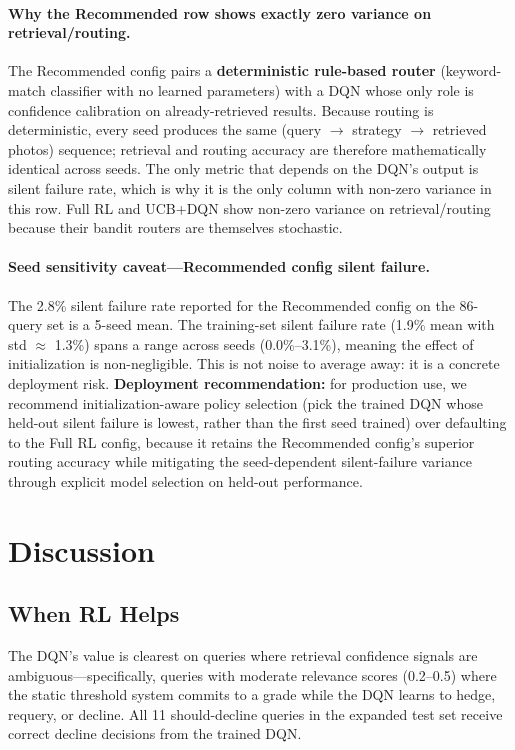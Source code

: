 \documentclass[11pt,letterpaper]{article}
\begin{document}
\paragraph{Why the Recommended row shows exactly zero variance on retrieval/routing.} The Recommended config pairs a \textbf{deterministic rule-based router} (keyword-match classifier with no learned parameters) with a DQN whose only role is confidence calibration on already-retrieved results. Because routing is deterministic, every seed produces the same (query $\to$ strategy $\to$ retrieved photos) sequence; retrieval and routing accuracy are therefore mathematically identical across seeds. The only metric that depends on the DQN's output is silent failure rate, which is why it is the only column with non-zero variance in this row. Full RL and UCB+DQN show non-zero variance on retrieval/routing because their bandit routers are themselves stochastic.

\paragraph{Seed sensitivity caveat---Recommended config silent failure.} The 2.8\% silent failure rate reported for the Recommended config on the 86-query set is a 5-seed mean. The training-set silent failure rate (1.9\% mean with std $\approx$ 1.3\%) spans a range across seeds (0.0\%--3.1\%), meaning the effect of initialization is non-negligible. This is not noise to average away: it is a concrete deployment risk. \textbf{Deployment recommendation:} for production use, we recommend initialization-aware policy selection (pick the trained DQN whose held-out silent failure is lowest, rather than the first seed trained) over defaulting to the Full RL config, because it retains the Recommended config's superior routing accuracy while mitigating the seed-dependent silent-failure variance through explicit model selection on held-out performance.

\section{Discussion}
\label{sec:discussion}

\subsection{When RL Helps}

The DQN's value is clearest on queries where retrieval confidence signals are ambiguous---specifically, queries with moderate relevance scores (0.2--0.5) where the static threshold system commits to a grade while the DQN learns to hedge, requery, or decline. All 11 should-decline queries in the expanded test set receive correct decline decisions from the trained DQN.
\end{document}
